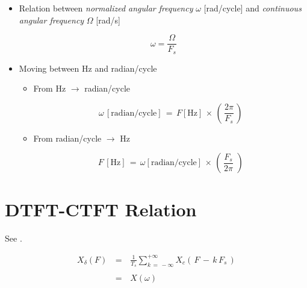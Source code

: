 \documentclass[12pt,a4paper]{book}
\begin{document}
\begin{itemize}

\item Relation between \textit{normalized angular frequency} $\omega$ [rad/cycle] and \textit{continuous angular frequency} $\Omega$ [rad/s] \cite{DSP_DimitrisManolakis}
    
\begin{equation}
    \omega  = \displaystyle\frac{\Omega}{F_s} 
\end{equation}

\item Moving between Hz and radian/cycle

\begin{itemize}
    \item From Hz $\rightarrow$ radian/cycle
    
    \begin{equation}
        \omega \, [\text{radian/cycle}] \, = \, F [\text{Hz}] \, \times \, \left( \, \displaystyle\frac{2 \pi}{F_s} \, \right)
    \end{equation}
    
    \item From radian/cycle $\rightarrow$  Hz
    
    \begin{equation}
        F \, [\text{Hz}] \, = \, \omega [\text{radian/cycle}] \, \times \, \left( \, \displaystyle\frac{F_s}{2 \pi} \, \, \right)
    \end{equation}
    
    
\end{itemize}


\end{itemize}

\section{DTFT-CTFT Relation}

See \cite{signal_processing_Lathi}.

\begin{equation}
\begin{array}{lll}
X_{\delta}(F) \, &=& \, \displaystyle\frac{1}{T_s} \displaystyle\sum\limits_{k \, = \, -\infty}^{+ \infty} X_c \left(\, F \, - \, k \,F_s  \,\right) \\ \\
                &=& \, X(\omega)
\end{array}
\label{Eq:DTFT-CTFT-Relation}
\end{equation}
\end{document}

